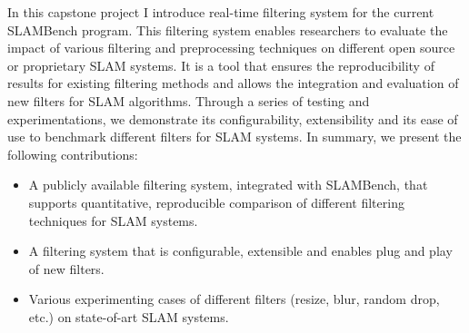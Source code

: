 In this capstone project I introduce real-time filtering system for the current SLAMBench program. 
This filtering system enables researchers to evaluate the impact of various filtering and preprocessing techniques on different open source or proprietary SLAM systems. 
It is a tool that ensures the reproducibility of results for existing filtering methods and allows the integration and evaluation of new filters for SLAM algorithms. 
Through a series of testing and experimentations, we demonstrate its configurability, extensibility and its ease of use to benchmark different filters for SLAM systems. 
In summary, we present the following contributions:
\begin{itemize}
	\item A publicly available filtering system, integrated with SLAMBench, that supports quantitative, reproducible comparison of different filtering techniques for SLAM systems.
	\item A filtering system that is configurable, extensible and enables plug and play of new filters.
	\item Various experimenting cases of different filters (resize, blur, random drop, etc.) on state-of-art SLAM systems.
\end{itemize}